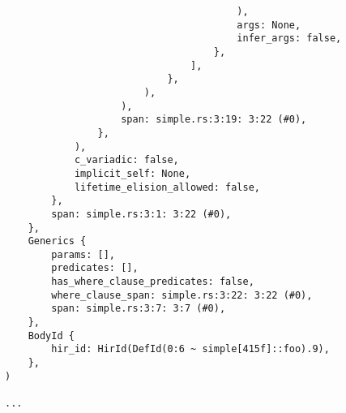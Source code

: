 \documentclass[
  11pt,
  twoside,symmetric]{report}
\begin{document}
\begin{verbatim}
                                        ),
                                        args: None,
                                        infer_args: false,
                                    },
                                ],
                            },
                        ),
                    ),
                    span: simple.rs:3:19: 3:22 (#0),
                },
            ),
            c_variadic: false,
            implicit_self: None,
            lifetime_elision_allowed: false,
        },
        span: simple.rs:3:1: 3:22 (#0),
    },
    Generics {
        params: [],
        predicates: [],
        has_where_clause_predicates: false,
        where_clause_span: simple.rs:3:22: 3:22 (#0),
        span: simple.rs:3:7: 3:7 (#0),
    },
    BodyId {
        hir_id: HirId(DefId(0:6 ~ simple[415f]::foo).9),
    },
)

...


\end{verbatim}
\end{document}
